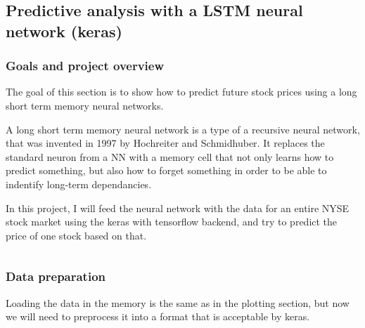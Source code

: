 \documentclass[12pt, a4paper]{article}
\begin{document}
\newpage
\subsection{Predictive analysis with a LSTM neural network (keras)}
\subsubsection{Goals and project overview}

The goal of this section is to show how to predict future stock prices using a long short term memory neural networks.


A long short term memory neural network is a type of a recursive neural network, that was invented in 1997 by Hochreiter and Schmidhuber\cite{hochreiter1997long}. It replaces the standard neuron from a NN with a memory cell that not only learns how to predict something, but also how to forget something in order to be able to indentify long-term dependancies.

In this project, I will feed the neural network with the data for an entire NYSE stock market using the keras\cite{chollet2015keras} with tensorflow\cite{abadi2016tensorflow} backend, and try to predict the price of one stock based on that.


\bgroup
  \inputminted[linenos, breaklines=true, fontsize=\scriptsize]{python}{src/stocks/lstm/0_imports.py}
  \label{listing:slstm_0_imports}
\egroup

\subsubsection{Data preparation}

Loading the data in the memory is the same as in the plotting section, but now we will need to preprocess it into a format that is acceptable by keras.

\bgroup
  \inputminted[linenos, breaklines=true, fontsize=\scriptsize, firstnumber=last]{python}{src/stocks/lstm/1_data.py}
  \label{listing:slstm_1_data}
\egroup


\end{document}
